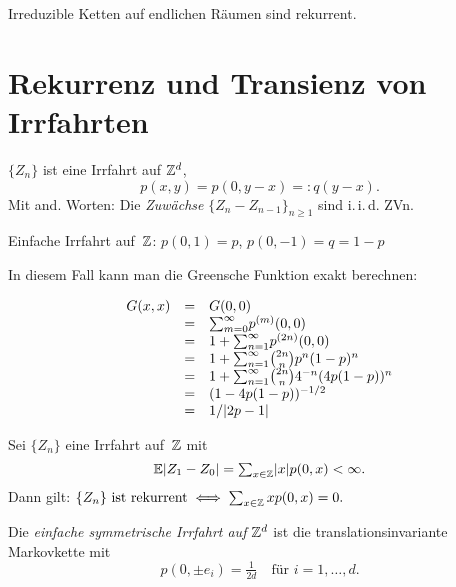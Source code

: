 \documentclass{cheat-sheet}
\newcommand{\E}{\mathbb{E}} %
\newcommand{\iid}{i.\,i.\,d.} %
\begin{document}

\begin{satz}
  Irreduzible Ketten auf endlichen Räumen sind rekurrent.
\end{satz}

\section{Rekurrenz und Transienz von Irrfahrten}

\begin{situation}
  $\{ Z_n \}$ ist eine Irrfahrt auf $\mathbb{Z}^d$, \dh{}
  \[ p(x, y) = p(0, y - x) =: q(y - x). \]
  Mit and. Worten: Die \textit{Zuwächse} $\{ Z_n - Z_{n-1} \}_{n \geq 1}$ sind \iid{} ZVn.
\end{situation}

\begin{bsp}
  Einfache Irrfahrt auf~$\mathbb{Z}$: \quad
  $p(0, 1) = p$, $p(0, -1) = q = 1 - p$
\end{bsp}


In diesem Fall kann man die Greensche Funktion exakt berechnen:

\[
  \begin{array}{r c l}
    G(x, x) &=& G(0,0) \\
    &=& {\sum}_{m=0}^\infty p^{(m)}(0, 0) \\
    &=& 1 + {\sum}_{n=1}^\infty p^{(2n)}(0, 0) \\
    &=& 1 + {\sum}_{n=1}^\infty \tbinom{2n}{n} p^n (1-p)^n \\
    &=& 1 + {\sum}_{n=1}^\infty \tbinom{2n}{n} 4^{-n} (4 p (1-p))^n \\
    &=& (1 - 4 p (1-p))^{-1/2} \\
    &=& 1/\abs{2p - 1}
  \end{array}
\]

\begin{satz}
  Sei $\{ Z_n \}$ eine Irrfahrt auf~$\mathbb{Z}$ mit
  \[ \E \abs{Z_1 - Z_0} = {\sum}_{x \in \Z} \abs{x} p(0, x) < \infty. \]
  Dann gilt: \quad
  $
    \{ Z_n \} \text{ ist rekurrent} \iff {\sum}_{x \in \Z} \, x p(0, x) = 0.
  $
\end{satz}

\begin{defn}
  Die \emph{einfache symmetrische Irrfahrt auf $\mathbb{Z}^d$} ist die translationsinvariante Markovkette mit
  \[
    p(0, \pm e_i) = \tfrac{1}{2 d} \quad \text{für } i = 1, \ldots, d.
  \]
\end{defn}
\end{document}

